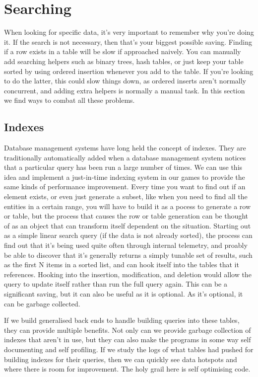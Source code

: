 \chapter{Searching}

When looking for specific data, it's very important to remember why you're
doing it. If the search is not necessary, then that's your biggest possible
saving. Finding if a row exists in a table will be slow if approached naively.
You can manually add searching helpers such as binary trees, hash tables, or
just keep your table sorted by using ordered insertion whenever you add to the
table. If you're looking to do the latter, this could slow things down, as
ordered inserts aren't normally concurrent, and adding extra helpers is
normally a manual task. In this section we find ways to combat all these
problems.

\section{Indexes}

Database management systems have long held the concept of indexes. They are
traditionally automatically added when a database management system notices
that a particular query has been run a large number of times. We can use this
idea and implement a just-in-time indexing system in our games to provide the
same kinds of performance improvement. Every time you want to find out if an
element exists, or even just generate a subset, like when you need to find all
the entities in a certain range, you will have to build it as a pocess to
generate a row or table, but the process that causes the row or table
generation can be thought of as an object that can transform itself dependent
on the situation. Starting out as a simple linear search query (if the data is
not already sorted), the process can find out that it's being used quite often
through internal telemetry, and proably be able to discover that it's generally
returns a simply tunable set of results, such as the first N items in a sorted
list, and can hook itself into the tables that it references. Hooking into the
insertion, modification, and deletion would allow the query to update itself
rather than run the full query again. This can be a significant saving, but it
can also be useful as it is optional. As it's optional, it can be garbage
collected.

If we build generalised back ends to handle building queries into these tables,
they can provide multiple benefits. Not only can we provide garbage collection
of indexes that aren't in use, but they can also make the programs in some way
self documenting and self profiling. If we study the logs of what tables had
pushed for building indexes for their queries, then we can quickly see data
hotspots and where there is room for improvement. The holy grail here is self
optimising code.

